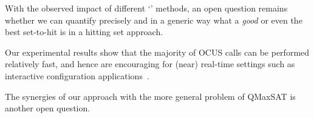 
With the observed impact of different `\grow' methods, an open question remains whether we can quantify precisely and in a generic way what a \textit{good} or even the best set-to-hit is in a hitting set approach. 

Our experimental results show that the majority of OCUS calls can be performed relatively fast, and hence are encouraging for (near) real-time settings such as interactive configuration applications~\cite{van2017kb}.


The synergies of our approach with the more general problem of QMaxSAT \cite{DBLP:journals/constraints/IgnatievJM16} is another open question.


